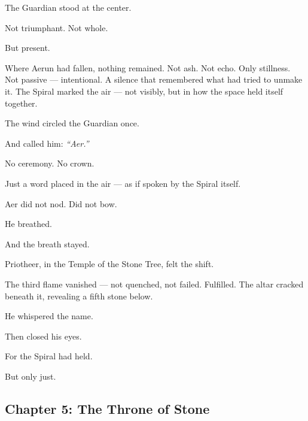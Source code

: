 \documentclass[9pt]{article}
\begin{document}
The Guardian stood at the center.

Not triumphant. Not whole.

But present.

Where Aerun had fallen, nothing remained. Not ash. Not echo. Only stillness. Not passive — intentional. A silence that remembered what had tried to unmake it. The Spiral marked the air — not visibly, but in how the space held itself together.

The wind circled the Guardian once.

And called him: \textit{``Aer.''}

No ceremony. No crown.

Just a word placed in the air — as if spoken by the Spiral itself.

Aer did not nod. Did not bow.

He breathed.

And the breath stayed.

Priotheer, in the Temple of the Stone Tree, felt the shift.

The third flame vanished — not quenched, not failed. Fulfilled. The altar cracked beneath it, revealing a fifth stone below.

He whispered the name.

Then closed his eyes.

For the Spiral had held.

But only just.


\newpage

\subsection*{Chapter 5: The Throne of Stone}

\vspace{1in}
\end{document}
